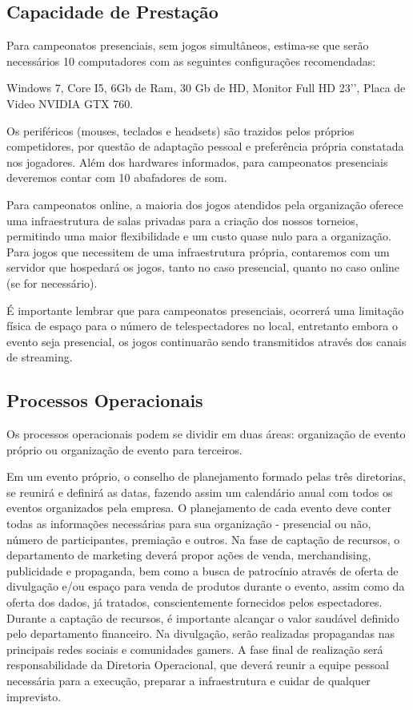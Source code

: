 \documentclass[a4paper, 12pt]{paper}
\begin{document}
\subsection{Capacidade de Prestação}
Para campeonatos presenciais, sem jogos simultâneos, estima-se que serão necessários 10 computadores com as seguintes configurações recomendadas:

Windows 7, Core I5,  6Gb de Ram, 30 Gb de HD, Monitor Full HD 23’’, Placa de Video NVIDIA GTX 760.

Os periféricos (mouses, teclados e headsets) são trazidos pelos próprios competidores, por questão de adaptação pessoal e preferência própria constatada nos jogadores. Além dos hardwares informados, para campeonatos presenciais deveremos contar com 10 abafadores de som. 

Para campeonatos online, a maioria dos jogos atendidos pela  organização oferece uma infraestrutura de salas privadas para a criação dos nossos torneios, permitindo uma maior flexibilidade e um custo quase nulo para a organização. Para jogos que necessitem de uma infraestrutura própria, contaremos com um servidor que hospedará os jogos, tanto no caso presencial, quanto no caso online (se for necessário).

É importante lembrar que para campeonatos presenciais, ocorrerá uma limitação física de espaço para o número de telespectadores no local, entretanto embora o evento seja presencial, os jogos continuarão sendo transmitidos através dos canais de streaming.
\subsection{Processos Operacionais}
Os processos operacionais podem se dividir em duas áreas: organização de evento próprio ou organização de evento para terceiros.

Em um evento próprio, o conselho de planejamento formado pelas três diretorias, se reunirá e definirá as datas, fazendo assim um calendário anual com todos os eventos organizados pela empresa. O planejamento de cada evento deve conter todas as informações necessárias para sua organização - presencial ou não, número de participantes, premiação e outros. Na fase de captação de recursos, o departamento de marketing deverá propor ações de venda, merchandising, publicidade e propaganda, bem como a busca de patrocínio através de oferta de divulgação e/ou espaço para venda de produtos durante o evento, assim como da oferta dos dados, já tratados, conscientemente fornecidos pelos espectadores. Durante a captação de recursos, é importante alcançar o valor saudável definido pelo departamento financeiro. Na divulgação, serão realizadas propagandas nas principais redes sociais e comunidades gamers. A fase final de realização será responsabilidade da Diretoria Operacional, que deverá reunir a equipe pessoal necessária para a execução, preparar a infraestrutura e cuidar de qualquer imprevisto.
\end{document}
